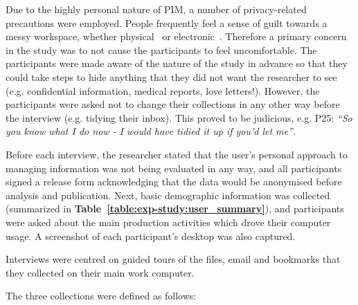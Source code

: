 Due to the highly personal nature of PIM, a number of privacy-related precautions were employed.  People frequently feel a sense of guilt towards a messy workspace, whether physical~\citep{tm:83} or electronic~\citep{Bellotti:00}.  %
Therefore a primary concern in the study was to not cause the participants to feel uncomfortable. 
The participants were made aware of the nature of the study in advance so that they could take steps to hide anything that they did not want the researcher to see (e.g. confidential information, medical reports, love letters!). However, the participants were asked not to change their collections in any other way before the interview (e.g. tidying their inbox).  This proved to be judicious, e.g. P25: \textit{``So you know what I do now - I would have tidied it up if you'd let me''}. 

Before each interview, the researcher stated that the user's personal approach to managing information was not being evaluated in any way, and all participants signed a release form acknowledging that the data would be anonymised before analysis and publication.  %
Next, basic demographic information was collected (summarized in \textbf{Table~\ref{table:exp-study:user_summary}}), and participants were asked about the main production activities which drove their computer usage. A screenshot of each participant's desktop was also captured.



Interviews were centred on guided tours of the files, email and bookmarks that they collected on their main work computer.

The three collections were defined as follows:

